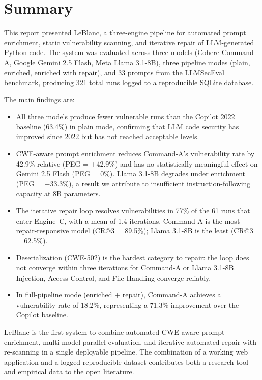\documentclass[12pt,a4paper]{report}
\begin{document}
\section{Summary}
\label{sec:summary}

This report presented LeBlanc, a three-engine pipeline for automated prompt
enrichment, static vulnerability scanning, and iterative repair of LLM-generated
Python code. The system was evaluated across three models (Cohere Command-A,
Google Gemini 2.5 Flash, Meta Llama 3.1-8B), three pipeline modes (plain,
enriched, enriched with repair), and 33 prompts from the LLMSecEval benchmark,
producing 321 total runs logged to a reproducible SQLite database.

The main findings are:

\begin{itemize}
  \item All three models produce fewer vulnerable runs than the Copilot 2022
        baseline (63.4\%) in plain mode, confirming that LLM code security has
        improved since 2022 but has not reached acceptable levels.

  \item CWE-aware prompt enrichment reduces Command-A's vulnerability rate by
        42.9\% relative (PEG = +42.9\%) and has no statistically meaningful
        effect on Gemini 2.5 Flash (PEG = 0\%). Llama 3.1-8B degrades under
        enrichment (PEG = $-$33.3\%), a result we attribute to insufficient
        instruction-following capacity at 8B parameters.

  \item The iterative repair loop resolves vulnerabilities in 77\% of the 61
        runs that enter Engine~C, with a mean of 1.4 iterations. Command-A is
        the most repair-responsive model (CR@3 = 89.5\%); Llama 3.1-8B is the
        least (CR@3 = 62.5\%).

  \item Deserialization (CWE-502) is the hardest category to repair: the loop
        does not converge within three iterations for Command-A or Llama 3.1-8B.
        Injection, Access Control, and File Handling converge reliably.

  \item In full-pipeline mode (enriched + repair), Command-A achieves a
        vulnerability rate of 18.2\%, representing a 71.3\% improvement over
        the Copilot baseline.
\end{itemize}

LeBlanc is the first system to combine automated CWE-aware prompt enrichment,
multi-model parallel evaluation, and iterative automated repair with re-scanning
in a single deployable pipeline. The combination of a working web application and
a logged reproducible dataset contributes both a research tool and empirical data
to the open literature.
\end{document}
